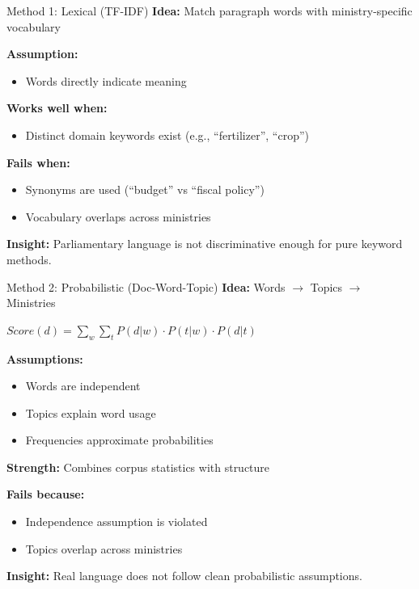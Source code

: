 \documentclass{beamer}
\begin{document}
\begin{frame}{Method 1: Lexical (TF-IDF)}
\textbf{Idea:} Match paragraph words with ministry-specific vocabulary

\vspace{0.5em}

\textbf{Assumption:}
\begin{itemize}
    \item Words directly indicate meaning
\end{itemize}

\textbf{Works well when:}
\begin{itemize}
    \item Distinct domain keywords exist (e.g., ``fertilizer'', ``crop'')
\end{itemize}

\textbf{Fails when:}
\begin{itemize}
    \item Synonyms are used (``budget'' vs ``fiscal policy'')
    \item Vocabulary overlaps across ministries
\end{itemize}

\vspace{0.5em}
\textbf{Insight:} Parliamentary language is not discriminative enough for pure keyword methods.
\end{frame}

\begin{frame}{Method 2: Probabilistic (Doc-Word-Topic)}
\textbf{Idea:} Words $\rightarrow$ Topics $\rightarrow$ Ministries

$Score(d) = \sum_{w} \sum_{t} P(d|w)\cdot P(t|w)\cdot P(d|t)$

\textbf{Assumptions:}
\begin{itemize}
    \item Words are independent
    \item Topics explain word usage
    \item Frequencies approximate probabilities
\end{itemize}

\textbf{Strength:} Combines corpus statistics with structure

\textbf{Fails because:}
\begin{itemize}
    \item Independence assumption is violated
    \item Topics overlap across ministries
\end{itemize}

\textbf{Insight:} Real language does not follow clean probabilistic assumptions.
\end{frame}
\end{document}
